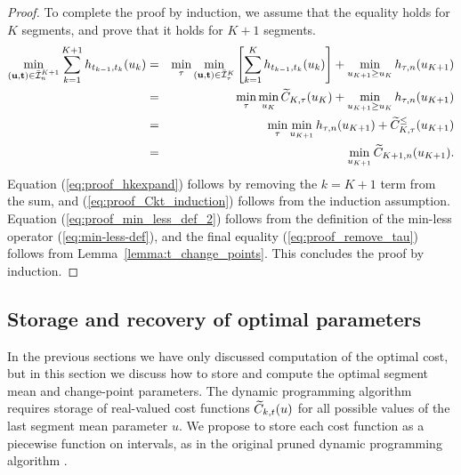 \documentclass{article}
\begin{document}
\begin{proof}
To complete the proof by induction, we assume that the equality holds for
$K$ segments, and prove that it holds for $K+1$ segments.
\begin{eqnarray}
  \label{eq:proof_separate_tau}
  \min_{(\mathbf u, \mathbf t)\in\bar{\mathcal I}_n^{K+1}}
  \sum_{k=1}^{K+1}
  h_{t_{k-1}, t_k}(u_k)
  &= & \label{eq:proof_hkexpand}\min_\tau
  \min_{(\mathbf u, \mathbf t)\in\bar{\mathcal I}_\tau^K}
       \left[
       \sum_{k=1}^K
       h_{t_{k-1},t_k}(u_k)
       \right]
       +\min_{u_{K+1}\geq u_K}
       h_{\tau, n} (u_{K+1})\\
&=& \min_\tau\min_{u_K} \widetilde{C}_{K,\tau}(u_K)\label{eq:proof_Ckt_induction}
    +\min_{u_{K+1}\geq u_K} h_{\tau,n}(u_{K+1})\\
&=& \min_\tau \min_{u_{K+1}} h_{\tau,n}(u_{K+1})\label{eq:proof_min_less_def_2}
+\widetilde{C}_{K,\tau}^\leq(u_{K+1})\\
&=& \min_{u_{K+1}} \widetilde{C}_{K+1,n}(u_{K+1}).\label{eq:proof_remove_tau}
\end{eqnarray}
Equation (\ref{eq:proof_hkexpand}) follows by removing the $k=K+1$
term from the sum, and (\ref{eq:proof_Ckt_induction}) follows from the
induction assumption. Equation (\ref{eq:proof_min_less_def_2}) follows
from the definition of the min-less operator (\ref{eq:min-less-def}),
and the final equality (\ref{eq:proof_remove_tau}) follows from
Lemma~\ref{lemma:t_change_points}. This concludes the proof by induction.
\end{proof}

\subsection{Storage and recovery of optimal parameters}
\label{sec:decoding}
In the previous sections we have only discussed computation of the
optimal cost, but in this section we discuss how to store and compute
the optimal segment mean and change-point parameters. The dynamic
programming algorithm requires storage of real-valued cost functions
$\widetilde{C}_{k,t}(u)$ for all possible values of the last segment mean
parameter $u$. We propose to store each cost function as a piecewise
function on intervals, as in the original pruned dynamic programming
algorithm \citep{pruned-dp}.
\end{document}
